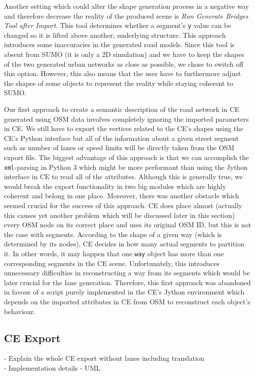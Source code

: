Another setting which could alter the shape generation process in a negative way and therefore decrease the reality of the produced scene is \emph{Run Generate Bridges Tool after Import}. This tool determines whether a segment's \texttt{y} value can be changed so it is lifted above another, underlying structure. This approach introduces some inaccuracies in the generated road models. Since this tool is absent from SUMO (it is only a 2D simulation) and we have to keep the shapes of the two generated urban networks as close as possible, we chose to switch off this option. However, this also means that the user have to furthermore adjust the shapes of some objects to represent the reality while staying coherent to SUMO.

Our first approach to create a semantic description of the road network in CE generated using OSM data involves completely ignoring the imported parameters in CE. We still have to export the vertices related to the CE's shapes using the CE's Python interface but all of the information about a given street segment such as number of lanes or speed limits will be directly taken from the OSM export file. The biggest advantage of this approach is that we can accomplish the \texttt{xml}-parsing in Python 3 which might be more performant than using the Jython interface in CE to read all of the attributes. Although this is generally true, we would break the export functionality in two big modules which are highly coherent and belong in one place. Moreover, there was another obstacle which seemed crucial for the success of this approach. CE does place almost (actually this causes yet another problem which will be discussed later in this section) every OSM node on its correct place and uses its original OSM ID, but this is not the case with segments. According to the shape of a given way (which is determined by its nodes), CE decides in how many actual segments to partition it. In other words, it may happen that one \texttt{way} object has more than one corresponding segments in the CE scene. Unfortunately, this introduces unnecessary difficulties in reconstructing a way from its segments which would be later crucial for the lane generation. Therefore, this first approach was abandoned in favour of a script purely implemented in the CE's Jython environment which depends on the imported attributes in CE from OSM to reconstruct each object's behaviour. 

\subsection{CE Export}
	- Explain the whole CE export without lanes including translation\\
	- Implementation details - UML

